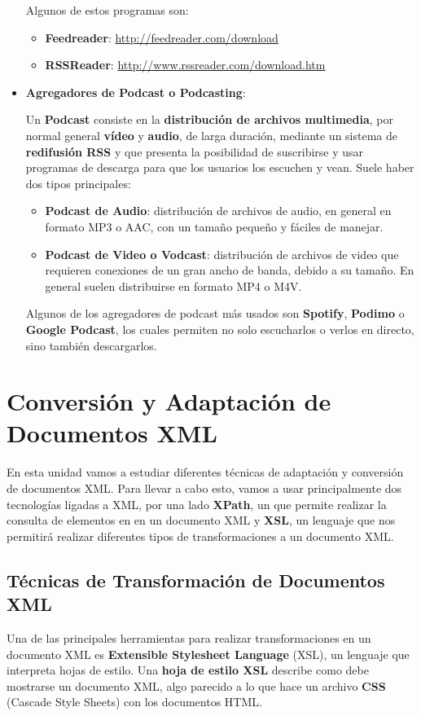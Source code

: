 \begin{itemize}
    Algunos de estos programas son:

    \begin{itemize}
        \item \textbf{Feedreader}: \url{http://feedreader.com/download}
        \item \textbf{RSSReader}: \url{http://www.rssreader.com/download.htm}
    \end{itemize}

    \item \textbf{Agregadores de Podcast o Podcasting}:

    Un \textbf{Podcast} consiste en la \textbf{distribución de archivos multimedia}, por normal general \textbf{vídeo} y \textbf{audio}, de larga duración, mediante un sistema de \textbf{redifusión RSS} y que presenta la posibilidad de suscribirse y usar programas de descarga para que los usuarios los escuchen y vean. Suele haber dos tipos principales:

    \begin{itemize}
        \item \textbf{Podcast de Audio}: distribución de archivos de audio, en general en formato MP3 o AAC, con un tamaño pequeño y fáciles de manejar.

        \item \textbf{Podcast de Video o  Vodcast}: distribución de archivos de video que requieren conexiones de un gran ancho de banda, debido a su tamaño. En general suelen distribuirse en formato MP4 o M4V.
    \end{itemize}

    Algunos de los agregadores de podcast más usados son \textbf{Spotify}, \textbf{Podimo} o \textbf{Google Podcast}, los cuales permiten no solo escucharlos o verlos en directo, sino también descargarlos.
\end{itemize}

\chapter{Conversión y Adaptación de Documentos XML}
En esta unidad vamos a estudiar diferentes técnicas de adaptación y conversión de documentos XML. Para llevar a cabo esto, vamos a usar principalmente dos tecnologías ligadas a XML, por una lado \textbf{XPath}, un que permite realizar la consulta de elementos en en un documento XML y \textbf{XSL}, un lenguaje que nos permitirá realizar diferentes tipos de transformaciones a un documento XML.

\section{Técnicas de Transformación de Documentos XML}
Una de las principales herramientas para realizar transformaciones en un documento XML es \textbf{Extensible Stylesheet Language} (XSL), un lenguaje que interpreta hojas de estilo. Una \textbf{hoja de estilo XSL} describe como debe mostrarse un documento XML, algo parecido a lo que hace un archivo  \textbf{CSS} (Cascade Style Sheets) con los documentos HTML.

